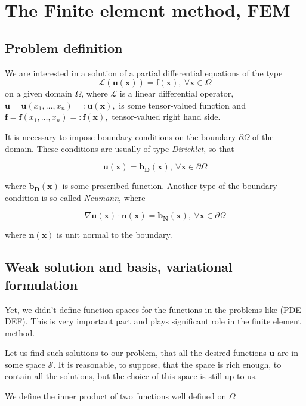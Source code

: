 \chapter{The Finite element method, FEM}
\section{Problem definition}
\par We are interested in a solution of a partial differential equations of the type 
$$\mathcal{L}(\mathbf{u(x)}) = \mathbf{f(x)},~\forall \mathbf{x}\in\Omega$$
on a given domain $\Omega$, where $\mathcal{L}$ is a linear differential operator, 
${\mathbf{u} = \mathbf{u}(x_1,\ldots,x_n)=:\mathbf{u(x)},}$ 
is some tensor-valued function and 
${\mathbf{f} = \mathbf{f}(x_1,\ldots,x_n)=:\mathbf{f(x)}},$
tensor-valued right hand side.

\par It is necessary to impose boundary conditions on the boundary $\partial\Omega$ of the domain. These conditions are usually of type \textit{Dirichlet}, so that

$$ \mathbf{u(x)} = \mathbf{b_D(x)},~\forall \mathbf{x} \in \partial\Omega $$

where $\mathbf{b_D(x)}$ is some prescribed function. Another type of the boundary condition is so called \textit{Neumann}, where

$$ \nabla \mathbf{u(x)}\cdot\mathbf{n(x)} = \mathbf{b_N(x)},~\forall \mathbf{x}\in\partial\Omega $$

where $\mathbf{n(x)}$ is unit normal to the boundary.

\section{Weak solution and basis, variational formulation}

\par Yet, we didn't define function spaces for the functions in the problems like (PDE DEF). 
This is very important part and plays significant role in the finite element method.
\par Let us find such solutions to our problem, that all the desired functions $\mathbf{u}$ are in some space $\mathcal{S}$.
It is reasonable, to suppose, that the space is rich enough, to contain all the solutions, but the choice of this space is still up to us. 
\par We define the inner product of two functions well defined on $\Omega$ 


